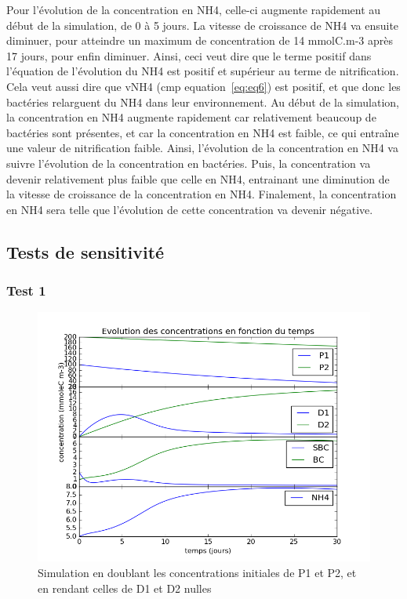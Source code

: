 \par{
Pour l'\'evolution de la concentration en NH4, celle-ci augmente rapidement au d\'ebut de la simulation, de 0 \`a 5 jours. La vitesse de croissance de NH4 va ensuite diminuer, pour atteindre un maximum de concentration de 14 mmolC.m-3 apr\`es 17 jours, pour enfin diminuer. Ainsi, ceci veut dire que le terme positif dans l'\'equation de l'\'evolution du NH4 est positif et sup\'erieur au terme de nitrification. Cela veut aussi dire que vNH4 (cmp equation~\ref{eq:eq6}) est positif, et que donc les bact\'eries relarguent du NH4 dans leur environnement. Au d\'ebut de la simulation, la concentration en NH4 augmente rapidement car relativement beaucoup de bact\'eries sont pr\'esentes, et car la concentration en NH4 est faible, ce qui entra\^ine une valeur de nitrification faible. Ainsi, l'\'evolution de la concentration en NH4 va suivre l'\'evolution de la concentration en bact\'eries. Puis, la concentration va devenir relativement plus faible que celle en NH4, entrainant une diminution de la vitesse de croissance de la concentration en NH4. Finalement, la concentration en NH4 sera telle que l'\'evolution de cette concentration va devenir n\'egative.
}

\FloatBarrier
\newpage

\subsection{Tests de sensitivit\'e}
\subsubsection{Test 1}

\begin{figure}[h!]
  \includegraphics[width=\textwidth]{partie2/Test1.png}
  \caption{Simulation en doublant les concentrations initiales de P1 et P2, et en rendant celles de D1 et D2 nulles
  }
  \label{fig:partie2test1}
\end{figure}

